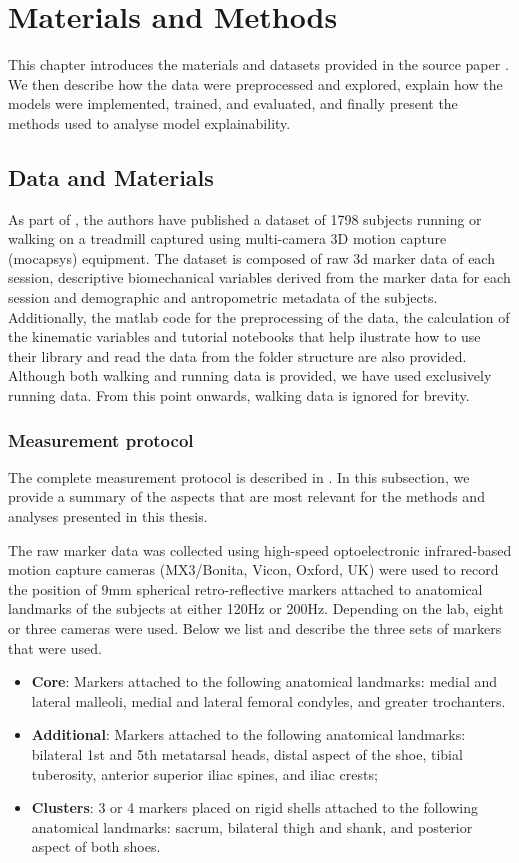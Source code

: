 \chapter{Materials and Methods}\label{chap:materials-methods}
This chapter introduces the materials and datasets provided in the source paper \citep{Ferber2024}. We then describe how the data were preprocessed and explored, explain how the models were implemented, trained, and evaluated, and finally present the methods used to analyse model explainability.

\section{Data and Materials}\label{sec:method-data-materials}
As part of \citet{Ferber2024}, the authors have published a dataset of 1798 \glspl{subject} running or walking on a treadmill captured using multi-camera 3D motion capture (\gls{mocapsys}) equipment. The dataset is composed of raw 3d marker data of each \gls{session}, descriptive biomechanical variables derived from the marker data for each session and demographic and antropometric metadata of the subjects. Additionally, the matlab code for the preprocessing of the data, the calculation of the kinematic variables and tutorial notebooks that help ilustrate how to use their library and read the data from the folder structure are also provided. Although both walking and running data is provided, we have used exclusively running data. From this point onwards, walking data is ignored for brevity.

\subsection{Measurement protocol}\label{subsec:measurement-protocol}
The complete measurement protocol is described in \citet{Ferber2024}. In this subsection, we provide a summary of the aspects that are most relevant for the methods and analyses presented in this thesis.

The raw marker data was collected using high-speed optoelectronic infrared-based motion capture cameras (MX3/Bonita, Vicon, Oxford, UK) were used to record the position of 9mm spherical retro-reflective markers attached to anatomical landmarks of the subjects at either 120Hz or 200Hz. Depending on the lab, eight or three cameras were used. Below we list and describe the three sets of markers that were used.
\begin{itemize}
    \item \textbf{Core}: Markers attached to the following anatomical landmarks: medial and lateral malleoli, medial and lateral femoral condyles, and greater trochanters.
    \item \textbf{Additional}: Markers attached to the following anatomical landmarks: bilateral 1st and 5th metatarsal heads, distal aspect of the shoe, tibial tuberosity, anterior superior iliac spines, and iliac crests;
    \item \textbf{Clusters}: 3 or 4 markers placed on rigid shells attached to the following anatomical landmarks: sacrum, bilateral thigh and shank, and posterior aspect of both shoes.
\end{itemize}


